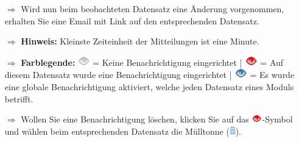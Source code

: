 \documentclass{article}
\begin{document}
\begin{multicols}{2}

\begin{tcolorbox}[colback=blue!5,colframe=blue!40!black,title=Benachrichtigungen erhalten]
\begin{itemize}
  \item[$\Longrightarrow$] Wird nun beim beobachteten Datensatz eine Änderung vorgenommen, erhalten Sie eine Email mit Link auf den entsprechenden Datensatz.
	\item[$\Longrightarrow$] \textbf{Hinweis:} Kleinste Zeiteinheit der Mitteilungen ist eine Minute.
  \item[$\Longrightarrow$] \textbf{Farblegende:} \includegraphics[height=12pt]{Icons/Auge_g.png} = Keine Benachrichtigung eingerichtet | \includegraphics[height=12pt]{Icons/Auge_r.png} = Auf diesem Datensatz wurde eine Benachrichtigung eingerichtet | \includegraphics[height=12pt]{Icons/Auge_b.png} = Es wurde eine globale Benachrichtigung aktiviert, welche jeden Datensatz eines Moduls betrifft.
	  \item[$\Longrightarrow$] Wollen Sie eine Benachrichtigung löschen, klicken Sie auf das \includegraphics[height=10pt]{Icons/Auge_r.png}-Symbol und wählen beim entsprechenden Datensatz die Mülltonne (\includegraphics[height=10pt]{Icons/Muelltonne.png}). 
\end{itemize}
\end{tcolorbox}





\end{multicols}
\end{document}
